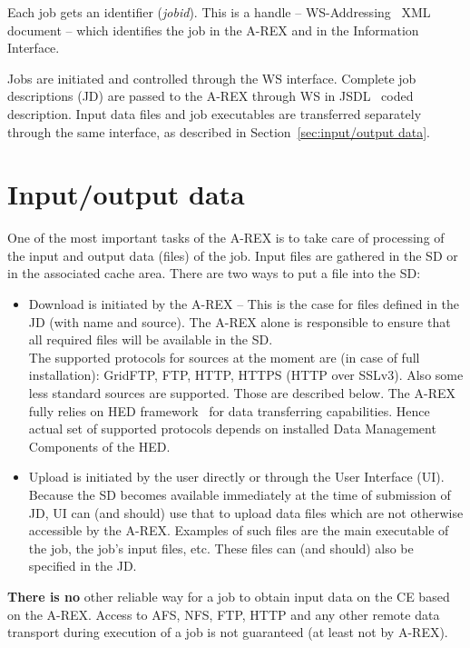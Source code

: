 \documentclass{article}                            %
\begin{document}
Each job gets an identifier (\textit{jobid}). This is a handle -- WS-Addressing~\cite{ws-addr-soap} XML document -- which identifies the job in the
A-REX and in the Information Interface.

Jobs are initiated and controlled through the WS interface. Complete
job descriptions (JD) are passed to the A-REX through WS in JSDL~\cite{jsdl}
coded description. Input data files and job executables are transferred
separately through the same interface, as described in Section~\ref{sec:input/output data}.

\section{Input/output data\label{sec:input/output data}}

One of the most important tasks of the A-REX is to take care of processing of the
input and output data (files) of the job. Input files are gathered
in the SD or in the associated cache area. There are two ways to put a file
into the SD:

\begin{itemize}
\item Download is initiated by the A-REX -- This is the case for files defined
in the JD (with name and source). The A-REX alone is responsible to
ensure that all required files will be available in the SD.\\
The supported protocols for sources at the moment are (in case of
full installation): GridFTP, FTP, HTTP, HTTPS (HTTP over SSLv3). Also
some less standard sources are supported. Those are described below.
The A-REX fully relies on HED framework~\cite{hed} for data transferring
capabilities. Hence actual set of supported protocols depends on installed
Data Management Components of the HED.
\item Upload is initiated by the user directly or through the User Interface
(UI). Because the SD becomes available immediately at the time of
submission of JD, UI can (and should) use that to upload data files
which are not otherwise accessible by the A-REX. Examples of such
files are the main executable of the job, the job's input files, etc.
These files can (and should) also be specified in the JD.
\end{itemize}
\textbf{There is no} other reliable way for a job to obtain input
data on the CE based on the A-REX. Access to AFS, NFS, FTP, HTTP and
any other remote data transport during execution of a job is not guaranteed
(at least not by A-REX).
\end{document}
